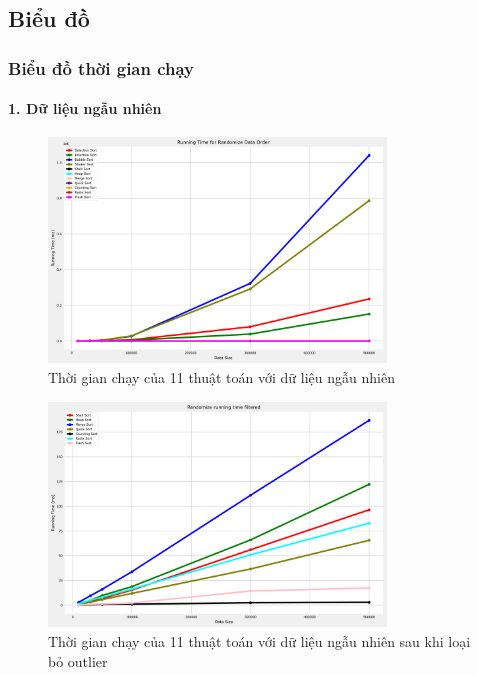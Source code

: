 \subsection{Biểu đồ}
\subsubsection{Biểu đồ thời gian chạy}

\paragraph{1. Dữ liệu ngẫu nhiên}
\begin{figure}[H]
    \centering
    \includegraphics[width=0.8\textwidth]{img/results/randomize_running_time.png}
    \caption{Thời gian chạy của 11 thuật toán với dữ liệu ngẫu nhiên}
\end{figure}



\begin{figure}[H]
    \centering
    \includegraphics[width=0.8\textwidth]{img/results/randomize_running_time_filtered.png}
    \caption{Thời gian chạy của 11 thuật toán với dữ liệu ngẫu nhiên sau khi loại bỏ outlier}
\end{figure}



